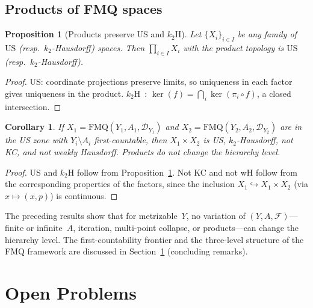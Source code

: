 \documentclass[11pt]{article}
\newtheorem{proposition}[theorem]{Proposition}
\newtheorem{corollary}[theorem]{Corollary}
\theoremstyle{definition}
\theoremstyle{remark}
\begin{document}
\subsection{Products of FMQ spaces}\label{subsec:products}

\begin{proposition}[Products preserve US and $k_2$H]\label{prop:products}
Let $\{X_i\}_{i \in I}$ be any family of $\mathrm{US}$
\textup{(}resp.\ $k_2$-Hausdorff\textup{)} spaces.
Then $\prod_{i \in I} X_i$ with the product topology is $\mathrm{US}$
\textup{(}resp.\ $k_2$-Hausdorff\textup{)}.
\end{proposition}

\begin{proof}
US: coordinate projections preserve limits, so uniqueness in each
factor gives uniqueness in the product.
$k_2$H~\cite{bib:clontzwilliams}: $\ker(f) = \bigcap_i \ker(\pi_i \circ f)$, a closed
intersection.
\end{proof}

\begin{corollary}\label{cor:products}
If $X_1 = \mathrm{FMQ}(Y_1, A_1, \mathcal{D}_{Y_1})$ and
$X_2 = \mathrm{FMQ}(Y_2, A_2, \mathcal{D}_{Y_2})$ are in the
US zone with $Y_i \setminus A_i$ first-countable, then
$X_1 \times X_2$ is US, $k_2$-Hausdorff, not KC, and not
weakly Hausdorff.
Products do not change the hierarchy level.
\end{corollary}

\begin{proof}
US and $k_2$H follow from Proposition~\ref{prop:products}.
Not KC and not wH follow from the corresponding properties of
the factors, since the inclusion
$X_1 \hookrightarrow X_1 \times X_2$ (via
$x \mapsto (x, p)$) is continuous.
\end{proof}

The preceding results show that for metrizable~$Y$,
no variation of $(Y, A, \mathcal{F})$---finite or infinite~$A$,
iteration, multi-point collapse, or products---can change the
hierarchy level.
The first-countability frontier and the three-level structure
of the FMQ framework are discussed in Section~\ref{sec:open}
(concluding remarks).

\section{Open Problems}\label{sec:open}
\end{document}
